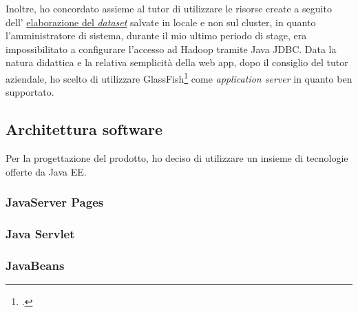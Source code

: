 Inoltre, ho concordato assieme al tutor di utilizzare le risorse create a seguito dell' \hyperref[dataseta]{elaborazione del \textit{dataset}} salvate in locale e non sul \gls{cluster}, in quanto l'amministratore di sistema, durante il mio ultimo periodo di stage, era impossibilitato a configurare l'accesso ad Hadoop tramite \gls{Java JDBC}. 
Data la natura didattica e la relativa semplicità della \gls{web app}, dopo il consiglio del tutor aziendale, ho scelto di utilizzare GlassFish\footcite{https://javaee.github.io/glassfish/} come \textit{application server} in quanto ben supportato.

\subsection{Architettura software}
Per la progettazione del prodotto, ho deciso di utilizzare un insieme di tecnologie offerte da Java EE.
\subsubsection{JavaServer Pages}

\subsubsection{Java Servlet}

\subsubsection{JavaBeans}


